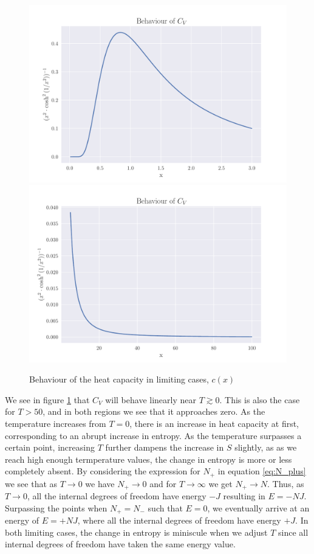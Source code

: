 \documentclass[reprint,english,notitlepage,aps,nobalancelastpage,nofootinbib]{revtex4-1}
\newcommand{\np}{N_+}
\begin{document}
\begin{figure}[h!]
	\centering
	\includegraphics[width=0.49\linewidth]{heat_cap3.pdf}
	\includegraphics[width=0.49\linewidth]{heat_cap100.pdf}
	\caption{Behaviour of the heat capacity in limiting cases, $c(x)$}
	\label{fig:Cv}
\end{figure}
We see in figure \ref{fig:Cv} that $C_V$ will behave linearly near $T\gtrsim0$. This is also the case for $T>50$, and in both regions we see that it approaches zero. As the temperature increases from $T=0$, there is an increase in heat capacity at first, corresponding to an abrupt increase in entropy. As the temperature surpasses a certain point, increasing $T$ further dampens the increase in $S$ slightly, as as we reach high enough termperature values, the change in entropy is more or less completely absent. By considering the expression for $\np$ in equation \eqref{eq:N_plus} we see that as $T\to 0$ we have $\np\to0$ and for $T\to\infty$ we get $\np\to N$. Thus, as $T\to0$, all the internal degrees of freedom have energy $-J$ resulting in $E=-NJ$. Surpassing the points when $\np=N_-$ such that $E=0$, we eventually arrive at an energy of $E=+NJ$, where all the internal degrees of freedom have energy $+J$. In both limiting cases, the change in entropy is miniscule when we adjust $T$ since all internal degrees of freedom have taken the same energy value.  
\end{document}
